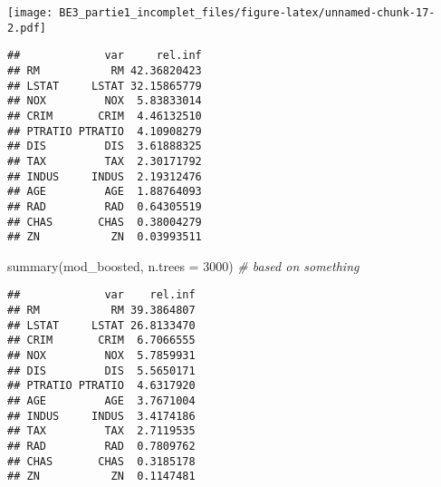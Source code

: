 \documentclass[
]{article}
\newenvironment{Shaded}{\begin{snugshade}}{\end{snugshade}}
\newcommand{\AttributeTok}[1]{\textcolor[rgb]{0.77,0.63,0.00}{#1}}
\newcommand{\CommentTok}[1]{\textcolor[rgb]{0.56,0.35,0.01}{\textit{#1}}}
\newcommand{\DecValTok}[1]{\textcolor[rgb]{0.00,0.00,0.81}{#1}}
\newcommand{\FunctionTok}[1]{\textcolor[rgb]{0.00,0.00,0.00}{#1}}
\newcommand{\NormalTok}[1]{#1}
\newcommand{\OtherTok}[1]{\textcolor[rgb]{0.56,0.35,0.01}{#1}}
\newcommand{\SpecialCharTok}[1]{\textcolor[rgb]{0.00,0.00,0.00}{#1}}
\begin{document}
\texttt{[image: BE3\_partie1\_incomplet\_files/figure-latex/unnamed-chunk-17-2.pdf]}

\begin{verbatim}
##             var     rel.inf
## RM           RM 42.36820423
## LSTAT     LSTAT 32.15865779
## NOX         NOX  5.83833014
## CRIM       CRIM  4.46132510
## PTRATIO PTRATIO  4.10908279
## DIS         DIS  3.61888325
## TAX         TAX  2.30171792
## INDUS     INDUS  2.19312476
## AGE         AGE  1.88764093
## RAD         RAD  0.64305519
## CHAS       CHAS  0.38004279
## ZN           ZN  0.03993511
\end{verbatim}

\begin{Shaded}
\begin{Highlighting}[]
\FunctionTok{summary}\NormalTok{(mod\_boosted, }\AttributeTok{n.trees =} \DecValTok{3000}\NormalTok{)       }\CommentTok{\# based on something}
\end{Highlighting}
\end{Shaded}

\begin{verbatim}
##             var    rel.inf
## RM           RM 39.3864807
## LSTAT     LSTAT 26.8133470
## CRIM       CRIM  6.7066555
## NOX         NOX  5.7859931
## DIS         DIS  5.5650171
## PTRATIO PTRATIO  4.6317920
## AGE         AGE  3.7671004
## INDUS     INDUS  3.4174186
## TAX         TAX  2.7119535
## RAD         RAD  0.7809762
## CHAS       CHAS  0.3185178
## ZN           ZN  0.1147481
\end{verbatim}

\begin{Shaded}
\end{Shaded}
\end{document}

